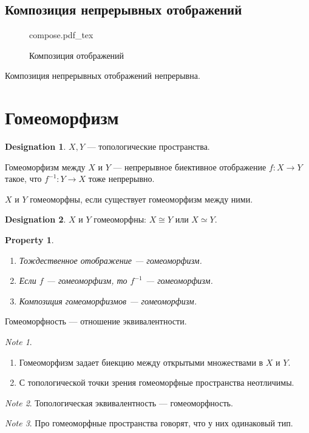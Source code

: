 \documentclass[11pt]{book}
\newcommand{\incfig}[1]{%
    \def\svgwidth{\columnwidth}
    {#1.pdf_tex}
}
\theoremstyle{definition}
\theoremstyle{plain}
\theoremstyle{plain}
\newtheorem*{prop}{Property}
\theoremstyle{definition}
\newtheorem*{name}{Designation}
\theoremstyle{remark}
\newtheorem*{note}{Note}
\begin{document}
\subsection{Композиция непрерывных отображений}
\begin{figure}[ht]
    \centering
    \incfig{compose}
    \caption{Композиция отображений}
    \label{fig:compose}
\end{figure}
\begin{thm}
    Композиция непрерывных отображений непрерывна.
\end{thm}
\section{Гомеоморфизм}
\begin{name}
    $ X, Y$ --- топологические пространства.
\end{name}
\begin{defn}
    Гомеоморфизм между  $ X$ и $ Y$  --- непрерывное биективное отображение $ f: X \to  Y$ такое, что $ f^{-1} : Y \to  X$ тоже непрерывно.
\end{defn}
\begin{defn}
    $ X$ и $ Y$ гомеоморфны, если существует гомеоморфизм между ними.
\end{defn}
\begin{name}
    $ X$ и $ Y$ гомеоморфны: $ X \cong Y$ или $ X \simeq Y$.
\end{name}
\begin{prop}
    $ $
    \begin{enumerate}
	\item Тождественное отображение --- гомеоморфизм.
	\item Если $ f$ --- гомеоморфизм, то $ f^{-1}$ --- гомеоморфизм.
	\item Композиция  гомеоморфизмов --- гомеоморфизм.
    \end{enumerate}
\end{prop}
\begin{thm}
    Гомеоморфность --- отношение эквивалентности.
\end{thm}
\begin{note}
    $ $
    \begin{enumerate}
	\item Гомеоморфизм задает биекцию между открытыми множествами в $ X$ и $ Y$.
	\item С топологической точки зрения гомеоморфные пространства неотличимы.
    \end{enumerate}
\end{note}
\begin{note}
    Топологическая эквивалентность --- гомеоморфность.
\end{note}
\begin{note}
    Про гомеоморфные пространства говорят, что у них одинаковый тип.
\end{note}
\end{document}
